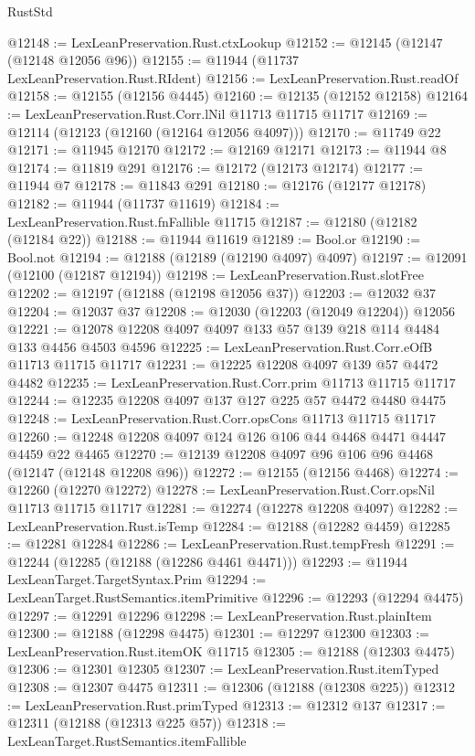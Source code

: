 \begin{lexlean}{RustStd}
\begin{coremodule}
@12148 := LexLeanPreservation.Rust.ctxLookup
@12152 := @12145 (@12147 (@12148 @12056 @96))
@12155 := @11944 (@11737 LexLeanPreservation.Rust.RIdent)
@12156 := LexLeanPreservation.Rust.readOf
@12158 := @12155 (@12156 @4445)
@12160 := @12135 (@12152 @12158)
@12164 := LexLeanPreservation.Rust.Corr.lNil @11713 @11715 @11717
@12169 := @12114 (@12123 (@12160 (@12164 @12056 @4097)))
@12170 := @11749 @22
@12171 := @11945 @12170
@12172 := @12169 @12171
@12173 := @11944 @8
@12174 := @11819 @291
@12176 := @12172 (@12173 @12174)
@12177 := @11944 @7
@12178 := @11843 @291
@12180 := @12176 (@12177 @12178)
@12182 := @11944 (@11737 @11619)
@12184 := LexLeanPreservation.Rust.fnFallible @11715
@12187 := @12180 (@12182 (@12184 @22))
@12188 := @11944 @11619
@12189 := Bool.or
@12190 := Bool.not
@12194 := @12188 (@12189 (@12190 @4097) @4097)
@12197 := @12091 (@12100 (@12187 @12194))
@12198 := LexLeanPreservation.Rust.slotFree
@12202 := @12197 (@12188 (@12198 @12056 @37))
@12203 := @12032 @37
@12204 := @12037 @37
@12208 := @12030 (@12203 (@12049 @12204)) @12056
@12221 := @12078 @12208 @4097 @4097 @133 @57 @139 @218 @114 @4484 @133 @4456 @4503 @4596
@12225 := LexLeanPreservation.Rust.Corr.eOfB @11713 @11715 @11717
@12231 := @12225 @12208 @4097 @139 @57 @4472 @4482
@12235 := LexLeanPreservation.Rust.Corr.prim @11713 @11715 @11717
@12244 := @12235 @12208 @4097 @137 @127 @225 @57 @4472 @4480 @4475
@12248 := LexLeanPreservation.Rust.Corr.opsCons @11713 @11715 @11717
@12260 := @12248 @12208 @4097 @124 @126 @106 @44 @4468 @4471 @4447 @4459 @22 @4465
@12270 := @12139 @12208 @4097 @96 @106 @96 @4468 (@12147 (@12148 @12208 @96))
@12272 := @12155 (@12156 @4468)
@12274 := @12260 (@12270 @12272)
@12278 := LexLeanPreservation.Rust.Corr.opsNil @11713 @11715 @11717
@12281 := @12274 (@12278 @12208 @4097)
@12282 := LexLeanPreservation.Rust.isTemp
@12284 := @12188 (@12282 @4459)
@12285 := @12281 @12284
@12286 := LexLeanPreservation.Rust.tempFresh
@12291 := @12244 (@12285 (@12188 (@12286 @4461 @4471)))
@12293 := @11944 LexLeanTarget.TargetSyntax.Prim
@12294 := LexLeanTarget.RustSemantics.itemPrimitive
@12296 := @12293 (@12294 @4475)
@12297 := @12291 @12296
@12298 := LexLeanPreservation.Rust.plainItem
@12300 := @12188 (@12298 @4475)
@12301 := @12297 @12300
@12303 := LexLeanPreservation.Rust.itemOK @11715
@12305 := @12188 (@12303 @4475)
@12306 := @12301 @12305
@12307 := LexLeanPreservation.Rust.itemTyped
@12308 := @12307 @4475
@12311 := @12306 (@12188 (@12308 @225))
@12312 := LexLeanPreservation.Rust.primTyped
@12313 := @12312 @137
@12317 := @12311 (@12188 (@12313 @225 @57))
@12318 := LexLeanTarget.RustSemantics.itemFallible

\end{coremodule}
\end{lexlean}
